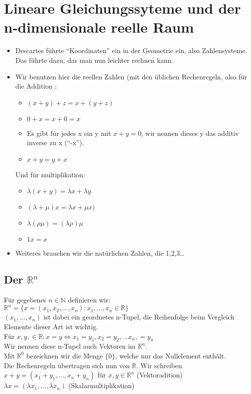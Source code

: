 \documentclass{article}
\newcommand{\lb}{\lambda}
\newcommand{\R}{\mathbb{R}}
\newcommand{\N}{\mathbb{N}}
\newcommand{\mR}{$\mathbb{R}$}
\newcommand{\Rn}{\mathbb{R}^n}
\newcommand{\mRn}{$\mathbb{R}^n$}
\begin{document}
\section{Lineare Gleichungssyteme und der n-dimensionale reelle Raum}
\begin{itemize}
\item{Descartes führte ``Koordinaten'' ein in der Geometrie ein, also Zahlensysteme. Das führte dazu, das man nun leichter rechnen kann.}
\item{Wir benutzen hier die reellen Zahlen (mit den üblichen Rechenregeln, also für die Addition :
\begin{itemize}
\item{$(x + y) + z = x + (y + z)$}\\
\item{$0 + x = x + 0 = x$}
\item{Es gibt für jedes x ein y mit $x + y = 0$, wir nennen dieses y das additiv inverse zu x (``-x'').}
\item{$x + y = y + x$}
\end{itemize}
Und für multiplikation:
\begin{itemize}
\item{$\lambda (x + y) = \lambda x + \lambda y$}
\item{$(\lambda + \mu) x = \lambda x + \mu x)$}
\item{$\lb(\rho\mu)=(\lb\rho)\mu$}
\item{$1x = x$}
\end{itemize}
}
\item{Weiteres brauchen wir die natürlichen Zahlen, die 1,2,3\dots}
\end{itemize}

\subsection{Der $\R^n$}
Für gegebenes $n \in \N$ definieren wir:\\
$\R^n = \{x = (x_1, x_2, \dots, x_n): x_1, \dots, x_n \in \R\}$\\
$(x_1, \dots, x_n)$ ist dabei ein geordnetes n-Tupel, die Reihenfolge beim Vergleich Elemente dieser Art ist wichtig.\\
Für $x, y, \in \R : x = y \Leftrightarrow x_1 = y_1, x_2 = y_2, \dots x_n, = y_n$\\
Wir nennen diese n-Tupel auch Vektoren im \mRn.\\
Mit $\R^0$ bezeichnen wir die Menge $\{0\}$, welche nur das Nullelement enthält.\\
Die Rechenregeln übertragen sich nun von \mR. Wir schreiben\\
$x + y = (x_1 + y_1, \dots, x_n + y_n)$ für $x, y \in \Rn$ (Vektoradition)\\
$\lb x = (\lb x_1, \dots, \lb x_n)$ (Skalarmultiplikation)
\end{document}
